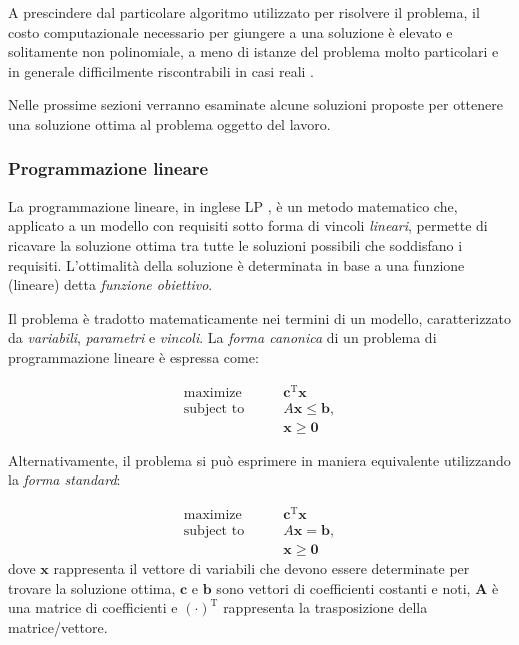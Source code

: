 A prescindere dal particolare algoritmo utilizzato per risolvere il problema, 
il costo computazionale necessario per giungere a una soluzione è elevato e 
solitamente non polinomiale, a meno di istanze del problema molto particolari e 
in generale difficilmente riscontrabili in casi reali 
\cite{PolynomialCompleteScheduling}.

Nelle prossime sezioni verranno esaminate alcune soluzioni proposte per 
ottenere una soluzione ottima al problema oggetto del lavoro.

\subsubsection{Programmazione lineare}
La programmazione lineare, in inglese \ac{LP} \cite{DantzigLinearProgramming}, è
un metodo matematico che, applicato a un modello con requisiti sotto forma di
vincoli \emph{lineari}, permette di ricavare la soluzione ottima tra tutte le
soluzioni possibili che soddisfano i requisiti. L'ottimalità della soluzione è
determinata in base a una funzione (lineare) detta \emph{funzione obiettivo}.

Il problema è tradotto matematicamente nei termini di un modello, 
caratterizzato da \emph{variabili}, \emph{parametri} e \emph{vincoli}.
La \emph{forma canonica} di un problema di programmazione lineare è espressa 
come:

\begin{equation}
\begin{split}
 \text{maximize} \qquad  & \mathbf{c}^\mathrm{T} \mathbf{x}\\
 \text{subject to} \qquad & A \mathbf{x} \le \mathbf{b},\\
  & \mathbf{x} \ge \mathbf{0}
\end{split}
\end{equation}

Alternativamente, il problema si può esprimere in maniera equivalente utilizzando
la \emph{forma standard}:

\begin{equation}
\begin{split}
 \text{maximize}   \qquad & \mathbf{c}^\mathrm{T} \mathbf{x}\\
 \text{subject to} \qquad & A \mathbf{x} = \mathbf{b}, \\
  & \mathbf{x} \ge \mathbf{0}
\end{split}
\end{equation}
dove $\mathbf{x}$ rappresenta il vettore di variabili che devono essere 
determinate per trovare la soluzione ottima, $\mathbf{c}$ e $\mathbf{b}$ sono 
vettori di coefficienti costanti e noti, $\mathbf{A}$ è una matrice di 
coefficienti e $(\mathord{\cdot})^\mathrm{T}$ 
rappresenta la trasposizione della matrice/vettore.

